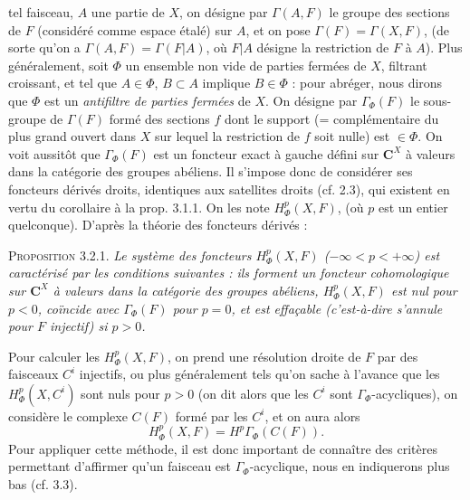 
\noindent tel faisceau, $A$ une partie de $X$, on désigne par $\Gamma(A,F)$ le
groupe des sections de $F$ (considéré comme espace étalé) sur $A$, et on pose
$\Gamma(F)=\Gamma(X,F)$, (de sorte qu'on a
$\Gamma(A,F)=\Gamma(F\vert A)$, où $F\vert A$ désigne la restriction de $F$ à
$A$). Plus généralement, soit $\Phi$ un ensemble non vide de parties fermées
de $X$, filtrant croissant, et tel que $A\in\Phi$, $B\subset A$ implique
$B\in\Phi$ : pour abréger, nous dirons que $\Phi$ est un \textit{antifiltre
de parties fermées} de $X$. On désigne par $\Gamma_\Phi(F)$ le sous-groupe de
$\Gamma(F)$ formé des sections $f$ dont le support (= complémentaire du plus
grand ouvert dans $X$ sur lequel la restriction de $f$ soit nulle) est
$\in\Phi$.
On voit aussitôt que $\Gamma_\Phi(F)$ est un foncteur exact à gauche défini
sur $\mathbf C^X$ à valeurs dans la catégorie des groupes abéliens. Il s'impose donc
de considérer ses foncteurs dérivés droits, identiques aux satellites droits
(cf. 2.3), qui existent en vertu du corollaire à la prop. 3.1.1. On les note
$H^p_\Phi(X,F)$, (où $p$ est un entier quelconque). D'après la théorie des
foncteurs dérivés :

\indent\textsc{Proposition 3.2.1.} \textit{Le système des foncteurs
$H^p_\Phi(X,F)$ \textup{(}$-\infty<p<+\infty$\textup{)} est caractérisé par les conditions
suivantes : ils forment un foncteur cohomologique sur $\mathbf C^X$ à valeurs dans la
catégorie des groupes abéliens, $H^p_\Phi(X,F)$ est nul pour $p<0$, coïncide
avec $\Gamma_\Phi(F)$ pour $p=0$, et est effaçable \textup{(}c'est-à-dire s'annule pour
$F$ injectif\textup{)} si $p>0$.}

Pour calculer les $H^p_\Phi(X,F)$, on prend une résolution droite de $F$ par
des faisceaux $C^i$ injectifs, ou plus généralement tels qu'on sache à
l'avance que les $H^p_\Phi(X,C^i)$ sont nuls pour $p>0$ (on dit alors que les
$C^i$ sont $\Gamma_\Phi$-acycliques), on considère le complexe $C(F)$ formé
par les $C^i$, et on aura alors
\[
H^p_\Phi(X,F)=H^p\Gamma_\Phi(C(F)).
\]
Pour appliquer cette méthode, il est donc important de connaître des critères
permettant d'affirmer qu'un faisceau est $\Gamma_\Phi$-acyclique, nous en
indiquerons plus bas (cf. 3.3).

